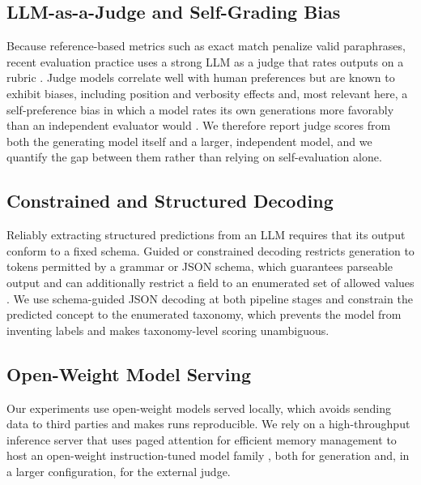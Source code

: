 \documentclass[onecolumn, 11pt]{IEEEtran}
\begin{document}
\subsection{LLM-as-a-Judge and Self-Grading Bias}
Because reference-based metrics such as exact match penalize valid paraphrases, recent evaluation practice uses a strong LLM as a judge that rates outputs on a rubric \cite{zheng2023judging}. Judge models correlate well with human preferences but are known to exhibit biases, including position and verbosity effects and, most relevant here, a self-preference bias in which a model rates its own generations more favorably than an independent evaluator would \cite{wang2023large, panickssery2024llm}. We therefore report judge scores from both the generating model itself and a larger, independent model, and we quantify the gap between them rather than relying on self-evaluation alone.

\subsection{Constrained and Structured Decoding}
Reliably extracting structured predictions from an LLM requires that its output conform to a fixed schema. Guided or constrained decoding restricts generation to tokens permitted by a grammar or JSON schema, which guarantees parseable output and can additionally restrict a field to an enumerated set of allowed values \cite{willard2023guided}. We use schema-guided JSON decoding at both pipeline stages and constrain the predicted concept to the enumerated taxonomy, which prevents the model from inventing labels and makes taxonomy-level scoring unambiguous.

\subsection{Open-Weight Model Serving}
Our experiments use open-weight models served locally, which avoids sending data to third parties and makes runs reproducible. We rely on a high-throughput inference server that uses paged attention for efficient memory management \cite{kwon2023efficient} to host an open-weight instruction-tuned model family \cite{qwen2024technical}, both for generation and, in a larger configuration, for the external judge.
\end{document}

